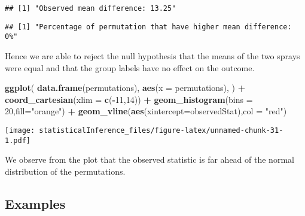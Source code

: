 \documentclass[
]{article}
\newenvironment{Shaded}{\begin{snugshade}}{\end{snugshade}}
\newcommand{\DataTypeTok}[1]{\textcolor[rgb]{0.13,0.29,0.53}{#1}}
\newcommand{\DecValTok}[1]{\textcolor[rgb]{0.00,0.00,0.81}{#1}}
\newcommand{\KeywordTok}[1]{\textcolor[rgb]{0.13,0.29,0.53}{\textbf{#1}}}
\newcommand{\NormalTok}[1]{#1}
\newcommand{\OperatorTok}[1]{\textcolor[rgb]{0.81,0.36,0.00}{\textbf{#1}}}
\newcommand{\StringTok}[1]{\textcolor[rgb]{0.31,0.60,0.02}{#1}}
\begin{document}
\begin{verbatim}
## [1] "Observed mean difference: 13.25"
\end{verbatim}

\begin{Shaded}
\end{Shaded}

\begin{verbatim}
## [1] "Percentage of permutation that have higher mean difference: 0%"
\end{verbatim}

Hence we are able to reject the null hypothesis that the means of the
two sprays were equal and that the group labels have no effect on the
outcome.

\begin{Shaded}
\begin{Highlighting}[]
\KeywordTok{ggplot}\NormalTok{(}
  \KeywordTok{data.frame}\NormalTok{(permutations),}
  \KeywordTok{aes}\NormalTok{(}\DataTypeTok{x =}\NormalTok{ permutations),}
\NormalTok{) }\OperatorTok{+}\StringTok{ }\KeywordTok{coord_cartesian}\NormalTok{(}\DataTypeTok{xlim =} \KeywordTok{c}\NormalTok{(}\OperatorTok{-}\DecValTok{11}\NormalTok{,}\DecValTok{14}\NormalTok{)) }\OperatorTok{+}
\StringTok{  }\KeywordTok{geom_histogram}\NormalTok{(}\DataTypeTok{bins =} \DecValTok{20}\NormalTok{,}\DataTypeTok{fill=}\StringTok{"orange"}\NormalTok{) }\OperatorTok{+}\StringTok{ }
\StringTok{  }\KeywordTok{geom_vline}\NormalTok{(}\KeywordTok{aes}\NormalTok{(}\DataTypeTok{xintercept=}\NormalTok{observedStat),}\DataTypeTok{col =} \StringTok{"red"}\NormalTok{)}
\end{Highlighting}
\end{Shaded}

\texttt{[image: statisticalInference\_files/figure-latex/unnamed-chunk-31-1.pdf]}

We observe from the plot that the observed statistic is far ahead of the
normal distribution of the permutations.

\hypertarget{examples}{%
\subsection{Examples}\label{examples}}
\end{document}
